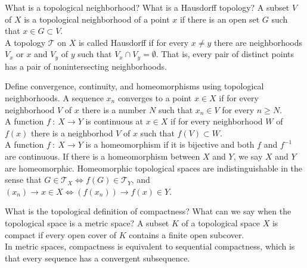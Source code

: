 \documentclass[avery5388,grid,frame]{flashcards}
\newcommand{\f}[3]{#1\ :\ #2 \rightarrow #3}
\def\topo{\mathcal{T}}
\begin{document}
\begin{flashcard}
    {What is a topological neighborhood?  What is a Hausdorff topology?}
    A subset $V$ of $X$ is a topological neighborhood of a point $x$ if there is an open set $G$ such that $x \in G \subset V$. \\

    A topology $\topo$ on $X$ is called Hausdorff if for every $x \neq y$ there are neighborhoods $V_x$ or $x$ and $V_y$ of $y$ such that $V_x \cap V_y = \emptyset$.  That is, every pair of distinct points has a pair of nonintersecting neighborhoods.
\end{flashcard}

\begin{flashcard}
    {Define convergence, continuity, and homeomorphisms using topological neighborhoods.}
    A sequence $x_n$ converges to a point $x \in X$ if for every neighborhood $V$ of $x$ there is a number $N$ such that $x_n \in V$ for every $n \geq N$. \\

    A function $\f{f}{X}{Y}$ is continuous at $x \in X$ if for every neighborhood $W$ of $f(x)$ there is a neighborhod $V$ of $x$ such that $f(V) \subset W$. \\

    A function $\f{f}{X}{Y}$ is a homeomorphism if it is bijective and both $f$ and $f^{-1}$ are continuous.  If there is a homeomorphism between $X$ and $Y$, we say $X$ and $Y$ are homeomorphic.  Homeomorphic topological spaces are indistinguishable in the sense that $G \in \topo_X \iff f(G) \in \topo_Y$, and $(x_n) \rightarrow x \in X \iff (f(x_n)) \rightarrow f(x) \in Y$.
\end{flashcard}

\begin{flashcard}
    {What is the topological definition of compactness?  What can we say when the topological space is a metric space?}
    A subset $K$ of a topological space $X$ is compact if every open cover of $K$ contains a finite open subcover. \\

    In metric spaces, compactness is equivalent to sequential compactness, which is that every sequence has a convergent subsequence.
\end{flashcard}
\end{document}
